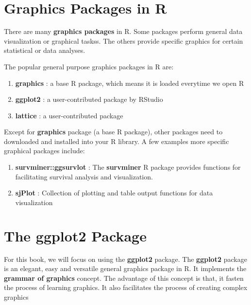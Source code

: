 \documentclass[
  10pt,
]{krantz}
\providecommand{\tightlist}{%
  \setlength{\itemsep}{0pt}\setlength{\parskip}{0pt}}
\begin{document}
\hypertarget{graphics-packages-in-r}{%
\section{Graphics Packages in R}\label{graphics-packages-in-r}}

There are many \textbf{graphics packages} in R. Some packages perform general data visualization or graphical taskss. The others provide specific graphics for certain statistical or data analyses.

The popular general purpose graphics packages in R are:

\begin{enumerate}
\def\labelenumi{\arabic{enumi}.}
\tightlist
\item
  \textbf{graphics} : a base R package, which means it is loaded everytime we open R
\item
  \textbf{ggplot2} : a user-contributed package by RStudio
\item
  \textbf{lattice} : a user-contributed package
\end{enumerate}

Except for \textbf{graphics} package (a base R package), other packages need to downloaded and installed into your R library. A few examples more specific graphical packages include:

\begin{enumerate}
\def\labelenumi{\arabic{enumi}.}
\tightlist
\item
  \textbf{survminer::ggsurvlot} : The \textbf{survminer} R package provides functions for facilitating survival analysis and visualization.
\item
  \textbf{sjPlot} : Collection of plotting and table output functions for data visualization
\end{enumerate}

\hypertarget{the-ggplot2-package}{%
\section{\texorpdfstring{The \textbf{ggplot2} Package}{The ggplot2 Package}}\label{the-ggplot2-package}}

For this book, we will focus on using the \textbf{ggplot2} package. The \textbf{ggplot2} package is an elegant, easy and versatile general graphics package in R. It implements the \textbf{grammar of graphics} concept. The advantage of this concept is that, it fasten the process of learning graphics. It also facilitates the process of creating complex graphics
\end{document}
